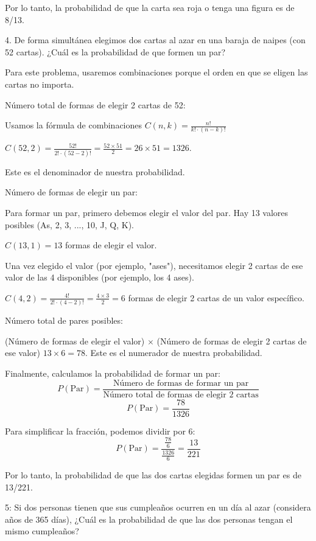 Por lo tanto, la probabilidad de que la carta sea roja o tenga una figura es de 8/13.

\newpage

4. De forma simultánea elegimos dos cartas al azar en una baraja de naipes 
(con 52 cartas). ¿Cuál es la probabilidad de que formen un par?

Para este problema, usaremos combinaciones porque el orden en que se eligen 
las cartas no importa.

Número total de formas de elegir 2 cartas de 52:

Usamos la fórmula de combinaciones $C(n, k) = \frac{n!}{k! \cdot (n-k)!}$

$C(52, 2) = \frac{52!}{2! \cdot (52-2)!} = \frac{52 \times 51}{2} = 26 \times 51 = 1326$.

Este es el denominador de nuestra probabilidad.

Número de formas de elegir un par:
    
Para formar un par, primero debemos elegir el valor del par. Hay 13 
valores posibles (As, 2, 3, ..., 10, J, Q, K).

$C(13, 1) = 13$ formas de elegir el valor.

Una vez elegido el valor (por ejemplo, "ases"), necesitamos elegir 2 cartas de ese valor de las 4 
disponibles (por ejemplo, los 4 ases).

$C(4, 2) = \frac{4!}{2! \cdot (4-2)!} = \frac{4 \times 3}{2} = 6$ 
formas de elegir 2 cartas de un valor específico.

Número total de pares posibles:
    
(Número de formas de elegir el valor) $\times$ (Número de formas de elegir 2 cartas de ese valor)
$13 \times 6 = 78$.
Este es el numerador de nuestra probabilidad.
    
Finalmente, calculamos la probabilidad de formar un par:
$$P(\text{Par}) = \frac{\text{Número de formas de formar un par}}{\text{Número total de formas de elegir 2 cartas}}$$
$$P(\text{Par}) = \frac{78}{1326}$$

Para simplificar la fracción, podemos dividir por 6:
$$P(\text{Par}) = \frac{\frac{78}{6}}{\frac{1326}{6}} = \frac{13}{221}$$

Por lo tanto, la probabilidad de que las dos cartas elegidas formen un par es de 13/221.

\newpage

5: Si dos personas tienen que sus cumpleaños ocurren en un día al azar 
(considera años de 365 días), ¿Cuál es la probabilidad de que las dos personas tengan el mismo cumpleaños?

